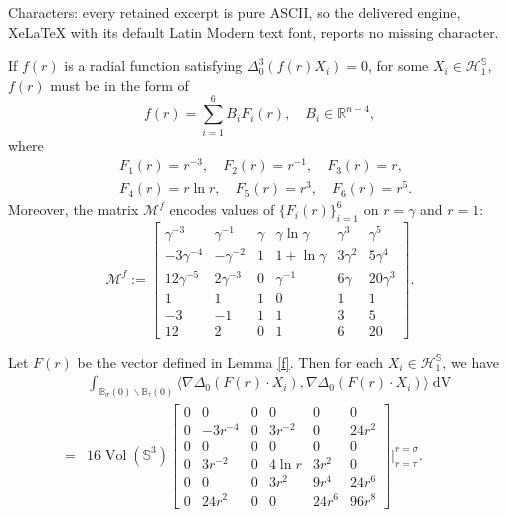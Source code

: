\documentclass[10pt,a4paper]{amsart}
\DeclareMathOperator{\Vol}{Vol}
\DeclareMathOperator{\dvol}{dV}
\newcommand{\bB}{\mathbb{B}}
\newcommand{\bR}{\mathbb{R}}
\newcommand{\bS}{\mathbb{S}}
\newcommand{\mM}{\mathcal{M}}
\begin{document}
Characters: every retained excerpt is pure ASCII, so the delivered engine, XeLaTeX with its default Latin Modern text font, reports no missing character.
\begin{lemma}\label{f}
    If $f(r)$ is a radial function satisfying $\Delta_0^3 (f(r)X_i)=0$, for some $X_i\in \mathcal{H}^{\bS}_{1}$, $f(r)$ must be in the form of
    \begin{equation}
        f(r)=\sum_{i=1}^{6}B_i F_i(r), \quad B_i\in \bR^{n-4},
    \end{equation}
where
\begin{equation*}
    \begin{split}
        &F_1(r)=r^{-3}, \quad F_2(r)=r^{-1}, \quad F_3(r)=r,\\
        &F_4(r)=r\ln r, \quad F_5(r)=r^3, \quad F_6(r)=r^5.
    \end{split}
\end{equation*}
Moreover, the matrix $\mM^{f}$ encodes values of $\{F_i(r)\}_{i=1}^{6}$ on $r=\gamma$ and $r=1$:
\begin{equation}\label{Mf}
\mM^{f}:=\begin{bmatrix}
\gamma^{-3} & \gamma^{-1} &  \gamma & \gamma \ln \gamma & \gamma^3& \gamma^5\\
-3\gamma^{-4} & -\gamma^{-2} & 1 & 1+\ln \gamma & 3\gamma^2& 5\gamma^4\\
12\gamma^{-5} & 2\gamma^{-3} & 0 & \gamma^{-1} & 6 \gamma& 20\gamma^3\\
1 & 1 & 1 & 0 & 1& 1\\
-3 & -1 & 1 & 1 & 3& 5\\
12 & 2 & 0 & 1 & 6& 20
\end{bmatrix}.
\end{equation}


\end{lemma}

\begin{lemma}\label{energy-f}
    Let $F(r)$ be the vector defined in Lemma \ref{f}. Then for each $X_i\in \mathcal{H}^{\bS}_{1}$, we have
\begin{equation}
\begin{split}
    &\int_{\bB_{\sigma}(0)\backslash \bB_{\tau}(0)}\langle \nabla \Delta_0 (F(r)\cdot X_i), \nabla \Delta_0(F(r)\cdot X_i)\rangle \dvol\\
    =&16 \Vol(\bS^3) \begin{bmatrix}
0 & 0 & 0 & 0 & 0& 0\\
0 & -3r^{-4} & 0 & 3r^{-2} & 0& 24r^2\\
0 & 0 & 0& 0& 0 & 0\\
0 & 3r^{-2} & 0 & {4\ln r} & 3r^2& 0\\
0 & 0 & 0 & 3r^2 & 9r^4& 24r^6\\
0 & 24r^2 & 0 & 0 & 24r^6& 96r^8
\end{bmatrix}\Bigg|_{r=\tau}^{r=\sigma}.
\end{split}
\end{equation}
    
\end{lemma}
\end{document}
